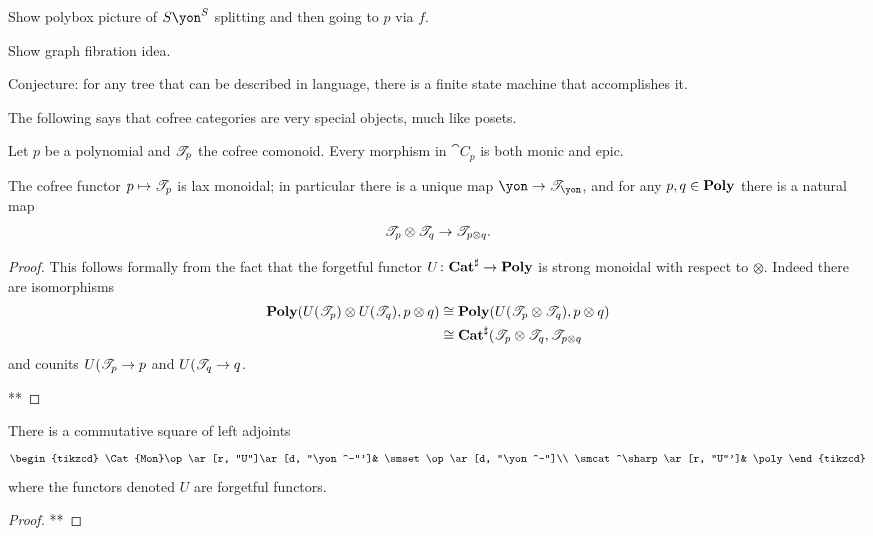 \documentclass[DynamicalBook]{subfiles}
\begin{document}
Show polybox picture of $S\yon^S$ splitting and then going to $p$ via $f$.

Show graph fibration idea.

Conjecture: for any tree that can be described in language, there is a finite state machine that accomplishes it.


The following says that cofree categories are very special objects, much like posets.

\begin{proposition}
Let $p$ be a polynomial and $\mathscr{T}_{p}$ the cofree comonoid. Every morphism in $\cat{C}_p$ is both monic and epic.
\end{proposition}



\begin{proposition}
The cofree functor $p\mapsto\mathscr{T}_{p}$ is lax monoidal; in particular there is a unique map $\yon\to\cofree{\yon}$, and for any $p,q\in\textbf{Poly}$ there is a natural map
\[
	\mathscr{T}_{p}\otimes\mathscr{T}_{q}\to\mathscr{T}_{p\otimes q}.
\]
\end{proposition}
\begin{proof}
This follows formally from the fact that the forgetful functor $U\colon\textbf{Cat}^\sharp\to\textbf{Poly}$ is strong monoidal with respect to $\otimes$. Indeed there are isomorphisms
\begin{align*}
	\textbf{Poly}(U(\mathscr{T}_{p})\otimes U(\mathscr{T}_{q}),p\otimes q)&\cong
	\textbf{Poly}(U(\mathscr{T}_{p}\otimes\mathscr{T}_{q}),p\otimes q)\\&\cong
	\textbf{Cat}^\sharp(\mathscr{T}_{p}\otimes\mathscr{T}_{q},\mathscr{T}_{p\otimes q}
\end{align*}
and counits $U(\mathscr{T}_{p}\to p$ and $U(\mathscr{T}_{q}\to q$.

**
\end{proof}

\begin{proposition}\label{prop.traj_mon_poly}
There is a commutative square of left adjoints
\[
\begin{tikzcd}
	\Cat{Mon}\op\ar[r, "U"]\ar[d, "\yon^-"']&
	\smset\op\ar[d, "\yon^-"]\\
	\smcat^\sharp\ar[r, "U"']&
	\poly
\end{tikzcd}
\]
where the functors denoted $U$ are forgetful functors.
\end{proposition}
\begin{proof}
**
\end{proof}
\end{document}

